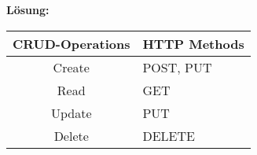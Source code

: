 \begin{aufgabe}{0}{0}{0}{0}{0}{0}{0}{0}
\begin{enumerate}
\begin{teilaufgabe}{2}
		\begin{loesung}
			\textbf{Lösung:}
			\begin{center}
				\begin{tabular}{|c|l|}
					\hline
					\textbf{CRUD-Operations} & \textbf{HTTP Methods} \\ \hline
					Create                   & POST, PUT             \\ \hline
					Read                     & GET                   \\ \hline
					Update                   & PUT                   \\ \hline
					Delete                   & DELETE                \\ \hline
					\end{tabular}
			  \end{center}
		\end{loesung}
	\end{teilaufgabe}


\end{enumerate}

\end{aufgabe}
